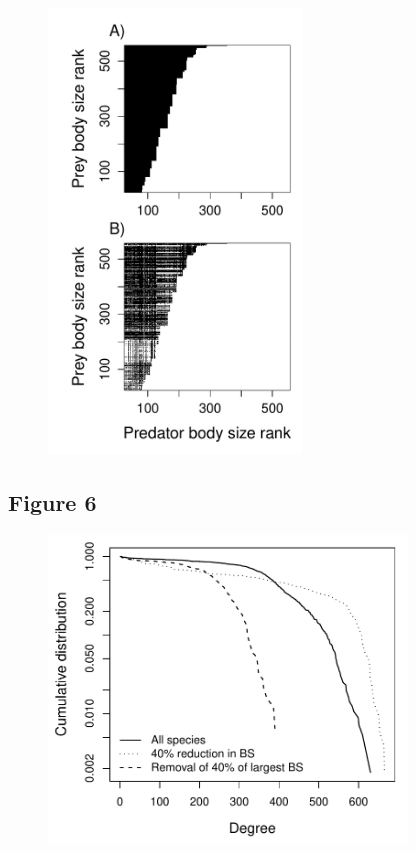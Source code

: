 \documentclass[12pt]{article}
\begin{document}
\begin{figure}[ht!]
	\centering\includegraphics[width=0.6\textwidth]{Example_MED.pdf}
\end{figure}

\newpage
\subsection*{Figure 6}

\begin{figure}[ht!]
	\centering\includegraphics[width=0.85\textwidth]{Degree.pdf}
\end{figure}
\end{document}
